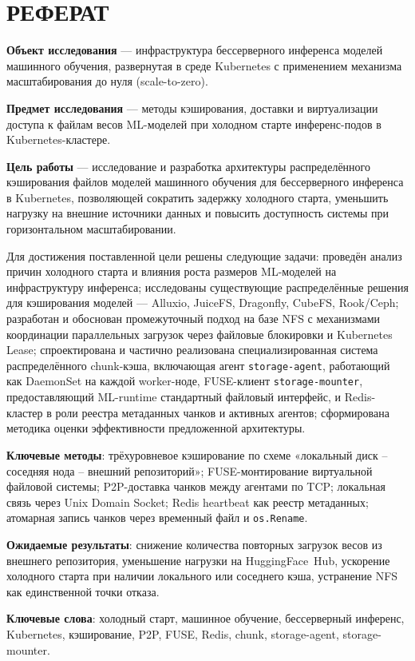 \chapter*{РЕФЕРАТ}

\textbf{Объект исследования} --- инфраструктура бессерверного инференса моделей машинного обучения, развернутая в среде Kubernetes с применением механизма масштабирования до нуля (scale-to-zero).

\textbf{Предмет исследования} --- методы кэширования, доставки и виртуализации доступа к файлам весов ML-моделей при холодном старте инференс-подов в Kubernetes-кластере.

\textbf{Цель работы} --- исследование и разработка архитектуры распределённого кэширования файлов моделей машинного обучения для бессерверного инференса в Kubernetes, позволяющей сократить задержку холодного старта, уменьшить нагрузку на внешние источники данных и повысить доступность системы при горизонтальном масштабировании.

Для достижения поставленной цели решены следующие задачи: проведён анализ причин холодного старта и влияния роста размеров ML-моделей на инфраструктуру инференса; исследованы существующие распределённые решения для кэширования моделей --- Alluxio, JuiceFS, Dragonfly, CubeFS, Rook/Ceph; разработан и обоснован промежуточный подход на базе NFS с механизмами координации параллельных загрузок через файловые блокировки и Kubernetes Lease; спроектирована и частично реализована специализированная система распределённого chunk-кэша, включающая агент \texttt{storage-agent}, работающий как DaemonSet на каждой worker-ноде, FUSE-клиент \texttt{storage-mounter}, предоставляющий ML-runtime стандартный файловый интерфейс, и Redis-кластер в роли реестра метаданных чанков и активных агентов; сформирована методика оценки эффективности предложенной архитектуры.

\textbf{Ключевые методы}: трёхуровневое кэширование по схеме «локальный диск -- соседняя нода -- внешний репозиторий»; FUSE-монтирование виртуальной файловой системы; P2P-доставка чанков между агентами по TCP; локальная связь через Unix Domain Socket; Redis heartbeat как реестр метаданных; атомарная запись чанков через временный файл и \texttt{os.Rename}.

\textbf{Ожидаемые результаты}: снижение количества повторных загрузок весов из внешнего репозитория, уменьшение нагрузки на HuggingFace~Hub, ускорение холодного старта при наличии локального или соседнего кэша, устранение NFS как единственной точки отказа.

\textbf{Ключевые слова}: холодный старт, машинное обучение, бессерверный инференс, Kubernetes, кэширование, P2P, FUSE, Redis, chunk, storage-agent, storage-mounter.
